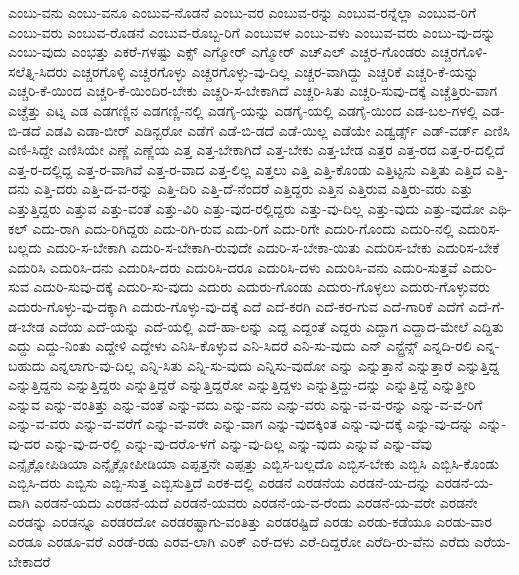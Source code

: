 {ಎಂಬು-ವನು
ಎಂಬು-ವನೂ
ಎಂಬುವ-ನೊಡನೆ
ಎಂಬು-ವರ
ಎಂಬುವ-ರನ್ನು
ಎಂಬುವ-ರನ್ನೆಲ್ಲಾ
ಎಂಬುವ-ರಿಗೆ
ಎಂಬು-ವರು
ಎಂಬುವ-ರೊಡನೆ
ಎಂಬುವ-ರೊಬ್ಬ-ರಿಗೆ
ಎಂಬುವಳ
ಎಂಬು-ವಳು
ಎಂಬುವ-ವರು
ಎಂಬು-ವು-ದನ್ನು
ಎಂಬು-ವುದು
ಎಂಭತ್ತು
ಎಕರೆ-ಗಳಷ್ಟು
ಎಕ್ಸ್
ಎಗ್ಮೋರ್
ಎಗ್ಮೋರ್
ಎಚ್ಎಲ್
ಎಚ್ಚರ-ಗೊಂಡರು
ಎಚ್ಚರಗೊಳಿ-ಸಲೆತ್ನಿ-ಸಿದರು
ಎಚ್ಚರಗೊಳ್ಳಿ
ಎಚ್ಚರಗೊಳ್ಳು
ಎಚ್ಚರಗೊಳ್ಳು-ವು-ದಿಲ್ಲ
ಎಚ್ಚರ-ವಾಗಿದ್ದು
ಎಚ್ಚರಿಕೆ
ಎಚ್ಚರಿ-ಕೆ-ಯನ್ನು
ಎಚ್ಚರಿ-ಕೆ-ಯಿಂದ
ಎಚ್ಚರಿ-ಕೆ-ಯಿಂದಿರ-ಬೇಕು
ಎಚ್ಚರಿ-ಸ-ಬೇಕಾಗಿದೆ
ಎಚ್ಚರಿ-ಸಿತು
ಎಚ್ಚರಿ-ಸುವು-ದಕ್ಕೆ
ಎಚ್ಚೆತ್ತಿರು-ವಾಗ
ಎಚ್ಚೆತ್ತು
ಎಟ್ನ
ಎಡ
ಎಡಗಣ್ಣಿನ
ಎಡಗಣ್ಣಿ-ನಲ್ಲಿ
ಎಡಗೈ-ಯನ್ನು
ಎಡಗೈ-ಯಲ್ಲಿ
ಎಡಗೈ-ಯಿಂದ
ಎಡ-ಬಲ-ಗಳಲ್ಲಿ
ಎಡ-ಬಿ-ಡದೆ
ಎಡವಿ
ಎಡಾ-ಬೀರ್
ಎಡಿನ್ಬರೋ
ಎಡೆಗೆ
ಎಡೆ-ಬಿ-ಡದೆ
ಎಡೆ-ಯಿಲ್ಲ
ಎಡೆಯೇ
ಎಡ್ವರ್ಡ್ಸ್
ಎಡ್-ವರ್ಡ್
ಎಣಿಸಿ
ಎಣಿ-ಸಿದ್ದೇ
ಎಣಿಸಿಯೇ
ಎಣ್ಣೆ
ಎಣ್ಣೆಯ
ಎತ್ತ
ಎತ್ತ-ಬೇಕಾಗಿದೆ
ಎತ್ತ-ಬೇಕು
ಎತ್ತ-ಬೇಡ
ಎತ್ತರ
ಎತ್ತ-ರದ
ಎತ್ತ-ರ-ದಲ್ಲಿದೆ
ಎತ್ತ-ರ-ದಲ್ಲಿದ್ದ
ಎತ್ತ-ರ-ವಾಗಿವೆ
ಎತ್ತ-ರ-ವಾದ
ಎತ್ತ-ಲಿಲ್ಲ
ಎತ್ತಲು
ಎತ್ತಿ
ಎತ್ತಿ-ಕೊಂಡು
ಎತ್ತಿಟ್ಟನು
ಎತ್ತಿತು
ಎತ್ತಿದ
ಎತ್ತಿ-ದನು
ಎತ್ತಿ-ದರು
ಎತ್ತಿ-ದ-ವ-ರನ್ನು
ಎತ್ತಿ-ದಿರಿ
ಎತ್ತಿ-ದೆ-ನೆಂದರೆ
ಎತ್ತಿದ್ದರು
ಎತ್ತಿನ
ಎತ್ತಿರುವ
ಎತ್ತಿರು-ವರು
ಎತ್ತು
ಎತ್ತುತ್ತಿದ್ದರು
ಎತ್ತುವ
ಎತ್ತು-ವಂತೆ
ಎತ್ತು-ವಿರಿ
ಎತ್ತು-ವುದ-ರಲ್ಲಿದ್ದರು
ಎತ್ತು-ವು-ದಿಲ್ಲ
ಎತ್ತು-ವುದು
ಎತ್ತು-ವುದೋ
ಎಥಿ-ಕಲ್
ಎದು-ರಾಗಿ
ಎದು-ರಿಗಿದ್ದರು
ಎದು-ರಿಗಿ-ರುವ
ಎದು-ರಿಗೆ
ಎದು-ರಿಗೇ
ಎದುರಿ-ಗೊಂದು
ಎದುರಿ-ನಲ್ಲಿ
ಎದುರಿಸ-ಬಲ್ಲದು
ಎದುರಿ-ಸ-ಬೇಕಾಗಿ
ಎದುರಿ-ಸ-ಬೇಕಾಗಿ-ರುವುದೇ
ಎದುರಿ-ಸ-ಬೇಕಾ-ಯಿತು
ಎದುರಿಸ-ಬೇಕು
ಎದುರಿಸ-ಬೇಕೆ
ಎದುರಿಸಿ
ಎದುರಿಸಿ-ದನು
ಎದುರಿಸಿ-ದರು
ಎದುರಿಸಿ-ದರೂ
ಎದುರಿಸಿ-ದಳು
ಎದುರಿಸಿ-ವನು
ಎದುರಿ-ಸುತ್ತವೆ
ಎದುರಿ-ಸುವ
ಎದುರಿ-ಸುವು-ದಕ್ಕೆ
ಎದುರಿ-ಸು-ವುದು
ಎದುರು
ಎದುರು-ಗೊಂಡು
ಎದುರು-ಗೊಳ್ಳಲು
ಎದುರು-ಗೊಳ್ಳುವರು
ಎದುರು-ಗೊಳ್ಳು-ವು-ದಕ್ಕಾಗಿ
ಎದುರು-ಗೊಳ್ಳು-ವು-ದಕ್ಕೆ
ಎದೆ
ಎದೆ-ಕರಗಿ
ಎದೆ-ಕರ-ಗುವ
ಎದೆ-ಗಾರಿಕೆ
ಎದೆಗೆ
ಎದೆ-ಗೆ-ಡ-ಬೇಡ
ಎದೆಯ
ಎದೆ-ಯನ್ನು
ಎದೆ-ಯಲ್ಲಿ
ಎದೆ-ಹಾ-ಲನ್ನು
ಎದ್ದ
ಎದ್ದಂತೆ
ಎದ್ದರು
ಎದ್ದಾಗ
ಎದ್ದಾದ-ಮೇಲೆ
ಎದ್ದಿತು
ಎದ್ದು
ಎದ್ದು-ನಿಂತು
ಎದ್ದೇಳಿ
ಎದ್ದೇಳು
ಎನಿಸಿ-ಕೊಳ್ಳುವ
ಎನಿ-ಸಿದರೆ
ಎನಿ-ಸು-ವುದು
ಎನ್
ಎನ್ಟ್ರೆನ್ಸ್
ಎನ್ನದಿ-ರಲಿ
ಎನ್ನ-ಬಹುದು
ಎನ್ನಲಾಗು-ವು-ದಿಲ್ಲ
ಎನ್ನಿ-ಸಿತು
ಎನ್ನಿ-ಸು-ವುದು
ಎನ್ನಿಸು-ವುದೋ
ಎನ್ನು
ಎನ್ನುತ್ತಾನೆ
ಎನ್ನುತ್ತಾರೆ
ಎನ್ನುತ್ತಿದ್ದ
ಎನ್ನುತ್ತಿದ್ದನು
ಎನ್ನುತ್ತಿದ್ದರು
ಎನ್ನುತ್ತಿದ್ದರೆ
ಎನ್ನುತ್ತಿದ್ದರೋ
ಎನ್ನುತ್ತಿದ್ದಳು
ಎನ್ನುತ್ತಿದ್ದು-ದನ್ನು
ಎನ್ನುತ್ತಿದ್ದೆ
ಎನ್ನುತ್ತೀರಿ
ಎನ್ನುವ
ಎನ್ನು-ವಂತಿತ್ತು
ಎನ್ನು-ವಂತೆ
ಎನ್ನು-ವದು
ಎನ್ನು-ವನು
ಎನ್ನು-ವರು
ಎನ್ನು-ವ-ವ-ರನ್ನು
ಎನ್ನು-ವ-ವ-ರಿಗೆ
ಎನ್ನು-ವ-ವರು
ಎನ್ನು-ವ-ವರೆಗೆ
ಎನ್ನು-ವ-ವರೇ
ಎನ್ನು-ವಾಗ
ಎನ್ನು-ವುದಕ್ಕಿಂತ
ಎನ್ನು-ವು-ದಕ್ಕೆ
ಎನ್ನು-ವು-ದನ್ನು
ಎನ್ನು-ವು-ದರ
ಎನ್ನು-ವು-ದ-ರಲ್ಲಿ
ಎನ್ನು-ವು-ದರೊ-ಳಗೆ
ಎನ್ನು-ವು-ದಿಲ್ಲ
ಎನ್ನು-ವುದು
ಎನ್ನುವೆ
ಎನ್ನು-ವೆವು
ಎನ್ಸೈಕ್ಲೋಪಿಡಿಯಾ
ಎನ್ಸೈಕ್ಲೋಪೀಡಿಯಾ
ಎಪ್ಪತ್ತನೇ
ಎಪ್ಪತ್ತು
ಎಬ್ಬಿಸ-ಬಲ್ಲದೊ
ಎಬ್ಬಿಸ-ಬೇಕು
ಎಬ್ಬಿಸಿ
ಎಬ್ಬಿಸಿ-ಕೊಂಡು
ಎಬ್ಬಿಸಿ-ದರು
ಎಬ್ಬಿಸು
ಎಬ್ಬಿ-ಸುತ್ತ
ಎಬ್ಬಿಸುತ್ತಿದೆ
ಎರಕ-ದಲ್ಲಿ
ಎರಡನೆ
ಎರಡನೆಯ
ಎರಡನೆ-ಯ-ದನ್ನು
ಎರಡನೆ-ಯ-ದಾಗಿ
ಎರಡನೆ-ಯದು
ಎರಡನೆ-ಯದೆ
ಎರಡನೆ-ಯವರು
ಎರಡನೆ-ಯ-ವ-ರೆಂದು
ಎರಡನೆ-ಯ-ವರೇ
ಎರಡನೇ
ಎರಡನ್ನು
ಎರಡನ್ನೂ
ಎರಡರದೋ
ಎರಡರಷ್ಟಾಗು-ವಂತಿತ್ತು
ಎರಡರಷ್ಟಿದೆ
ಎರಡು
ಎರಡು-ಕಡೆಯೂ
ಎರಡು-ವಾರ
ಎರಡೂ
ಎರಡೂ-ವರೆ
ಎರಡೆ-ರಡು
ಎರವ-ಲಾಗಿ
ಎರಿಕ್
ಎರೆ-ದಳು
ಎರೆ-ದಿದ್ದರೋ
ಎರೆದಿ-ರು-ವೆನು
ಎರೆದು
ಎರೆಯ-ಬೇಕಾದರೆ
}
